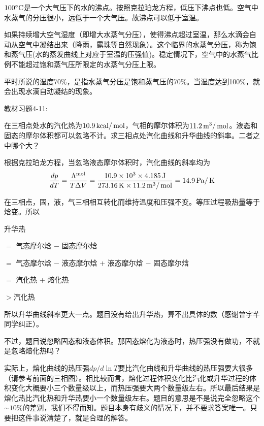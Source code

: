 \documentclass[CJK]{beamer}
\begin{document}
\begin{frame}
  \bch
  $100^\circ \mathrm{C}$是一个大气压下的水的沸点。按照克拉珀龙方程，低压下沸点也低。空气中水蒸气的分压很小，远低于一个大气压。故沸点可以低于室温。

  \skipline

  如果持续增大空气湿度（即增大水蒸气分压），使得沸点超过室温，那么水滴会自动从空气中凝结出来（降雨，露珠等自然现象）。这个临界的水蒸气分压，称为饱和蒸气压(水的蒸发曲线上对应于室温的压强值)。稳定情况下，空气中的水蒸气比例不能超过饱和蒸气压所限定的水蒸气分压上限。

  \skipline
  
  平时所说的湿度70\%，是指水蒸气分压是饱和蒸气压的70\%。当湿度达到100\%，就会出现水滴自动凝结的现象。
  \ech
\end{frame}


\begin{frame}
  \chtitle{\proid (\stwo)}
  \bch
  教材习题4-11:

  在三相点处水的汽化热为$10.9\,\mathrm{kcal}/\,\mathrm{mol}$，气相的摩尔体积为$11.2\,\mathrm{m}^3/\,\mathrm{mol}$。液态和固态的摩尔体积都可以忽略不计。求三相点处汽化曲线和升华曲线的斜率。二者之中哪个大？
  \ech
\end{frame}


\begin{frame}
  \bch
  根据克拉珀龙方程，当忽略液态摩尔体积时，汽化曲线的斜率均为
  $$\frac{dp}{dT} = \frac{\Lambda^{\rm mol}}{T\Delta V} = \frac{10.9\times 10^3 \times 4.185 \,\mathrm{J}}{273.16\,\mathrm{K}\times 11.2\,\mathrm{m}^3/\,\mathrm{mol}} = 14.9 \,\mathrm{Pa}/\,\mathrm{K}$$

  在三相点，固，液，气三相相互转化而维持温度和压强不变。等压过程吸热量等于焓变。所以

  {\small
  升华热

  $=$ 气态摩尔焓 $-$ 固态摩尔焓

  $=$ 气态摩尔焓 $-$ 液态摩尔焓 $+$ 液态摩尔焓 $-$ 固态摩尔焓

  $=$ 汽化热 + 熔化热

  $>$汽化热
  }
  
  所以升华曲线斜率更大一点。题目没有给出升华热，算不出具体的数（感谢曾宇芊同学纠正）。
  
  \ech
\end{frame}

\begin{frame}
  \bch

  不过，题目说忽略固态和液态体积。那固态熔化为液态时，热压强没有做功，不就是忽略熔化热吗？

  \skiplines
  
  实际上，熔化曲线的热压强$dp/d\ln T$要比汽化曲线和升华曲线的热压强要大很多（请参考前面的三相图）。相比较而言，熔化过程体积变化比汽化或升华过程的体积变化大概要小三个数量级以上，而热压强要大两个数量级左右。所以最后结果是熔化热比汽化热和升华热要小一个数量级左右。题目的意思是不是说完全忽略这个$\sim 10\%$的差别，我们不得而知。题目本身有歧义的情况下，并不要求答案唯一。只要把这件事说清楚了，就是合理的解答。

  
  \ech
\end{frame}
\end{document}
